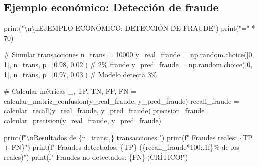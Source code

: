 \documentclass[
  doc,
  floatsintext,
  longtable,
  a4paper,
  nolmodern,
  notxfonts,
  notimes,
  12pt,
  colorlinks=true,linkcolor=blue,citecolor=blue,urlcolor=blue]{apa7}
\newenvironment{Shaded}{\begin{snugshade}}{\end{snugshade}}
\newcommand{\BuiltInTok}[1]{\textcolor[rgb]{0.00,0.23,0.31}{#1}}
\newcommand{\CharTok}[1]{\textcolor[rgb]{0.13,0.47,0.30}{#1}}
\newcommand{\CommentTok}[1]{\textcolor[rgb]{0.37,0.37,0.37}{#1}}
\newcommand{\DecValTok}[1]{\textcolor[rgb]{0.68,0.00,0.00}{#1}}
\newcommand{\FloatTok}[1]{\textcolor[rgb]{0.68,0.00,0.00}{#1}}
\newcommand{\NormalTok}[1]{\textcolor[rgb]{0.00,0.23,0.31}{#1}}
\newcommand{\OperatorTok}[1]{\textcolor[rgb]{0.37,0.37,0.37}{#1}}
\newcommand{\SpecialCharTok}[1]{\textcolor[rgb]{0.37,0.37,0.37}{#1}}
\newcommand{\SpecialStringTok}[1]{\textcolor[rgb]{0.13,0.47,0.30}{#1}}
\newcommand{\StringTok}[1]{\textcolor[rgb]{0.13,0.47,0.30}{#1}}
\begin{document}
\subsection{Ejemplo económico: Detección de
fraude}\label{ejemplo-econuxf3mico-detecciuxf3n-de-fraude}

\begin{Shaded}
\begin{Highlighting}[]
\BuiltInTok{print}\NormalTok{(}\StringTok{"}\CharTok{\textbackslash{}n\textbackslash{}n}\StringTok{EJEMPLO ECONÓMICO: DETECCIÓN DE FRAUDE"}\NormalTok{)}
\BuiltInTok{print}\NormalTok{(}\StringTok{"="} \OperatorTok{*} \DecValTok{70}\NormalTok{)}

\CommentTok{\# Simular transacciones}
\NormalTok{n\_trans }\OperatorTok{=} \DecValTok{10000}
\NormalTok{y\_real\_fraude }\OperatorTok{=}\NormalTok{ np.random.choice([}\DecValTok{0}\NormalTok{, }\DecValTok{1}\NormalTok{], n\_trans, p}\OperatorTok{=}\NormalTok{[}\FloatTok{0.98}\NormalTok{, }\FloatTok{0.02}\NormalTok{])  }\CommentTok{\# 2\% fraude}
\NormalTok{y\_pred\_fraude }\OperatorTok{=}\NormalTok{ np.random.choice([}\DecValTok{0}\NormalTok{, }\DecValTok{1}\NormalTok{], n\_trans, p}\OperatorTok{=}\NormalTok{[}\FloatTok{0.97}\NormalTok{, }\FloatTok{0.03}\NormalTok{])  }\CommentTok{\# Modelo detecta 3\%}

\CommentTok{\# Calcular métricas}
\NormalTok{\_, TP, TN, FP, FN }\OperatorTok{=}\NormalTok{ calcular\_matriz\_confusion(y\_real\_fraude, y\_pred\_fraude)}
\NormalTok{recall\_fraude }\OperatorTok{=}\NormalTok{ calcular\_recall(y\_real\_fraude, y\_pred\_fraude)}
\NormalTok{precision\_fraude }\OperatorTok{=}\NormalTok{ calcular\_precision(y\_real\_fraude, y\_pred\_fraude)}

\BuiltInTok{print}\NormalTok{(}\SpecialStringTok{f"}\CharTok{\textbackslash{}n}\SpecialStringTok{Resultados de }\SpecialCharTok{\{}\NormalTok{n\_trans}\SpecialCharTok{:,\}}\SpecialStringTok{ transacciones:"}\NormalTok{)}
\BuiltInTok{print}\NormalTok{(}\SpecialStringTok{f"  Fraudes reales: }\SpecialCharTok{\{}\NormalTok{TP }\OperatorTok{+}\NormalTok{ FN}\SpecialCharTok{\}}\SpecialStringTok{"}\NormalTok{)}
\BuiltInTok{print}\NormalTok{(}\SpecialStringTok{f"  Fraudes detectados: }\SpecialCharTok{\{}\NormalTok{TP}\SpecialCharTok{\}}\SpecialStringTok{ (}\SpecialCharTok{\{}\NormalTok{recall\_fraude}\OperatorTok{*}\DecValTok{100}\SpecialCharTok{:.1f\}}\SpecialStringTok{\% de los reales)"}\NormalTok{)}
\BuiltInTok{print}\NormalTok{(}\SpecialStringTok{f"  Fraudes no detectados: }\SpecialCharTok{\{}\NormalTok{FN}\SpecialCharTok{\}}\SpecialStringTok{ ¡CRÍTICO!"}\NormalTok{)}


\end{Highlighting}
\end{Shaded}
\end{document}
